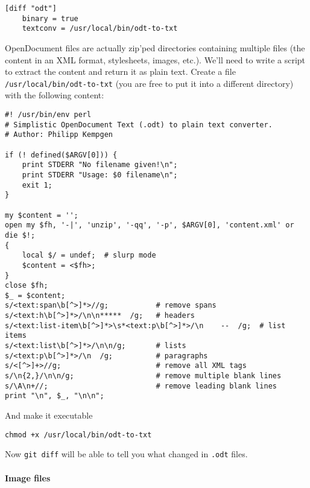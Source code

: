 \documentclass[a4paper]{book}
\newcounter{tab}[chapter]
\begin{document}
\begin{shaded}\begin{verbatim}
[diff "odt"]
	binary = true
	textconv = /usr/local/bin/odt-to-txt
\end{verbatim}\end{shaded}

OpenDocument files are actually zip'ped directories containing multiple files (the content in an XML format, stylesheets, images, etc.). We'll need to write a script to extract the content and return it as plain text. Create a file \texttt{/usr/local/bin/odt-to-txt} (you are free to put it into a different directory) with the following content:

\begin{shaded}\begin{verbatim}
#! /usr/bin/env perl
# Simplistic OpenDocument Text (.odt) to plain text converter.
# Author: Philipp Kempgen

if (! defined($ARGV[0])) {
	print STDERR "No filename given!\n";
	print STDERR "Usage: $0 filename\n";
	exit 1;
}

my $content = '';
open my $fh, '-|', 'unzip', '-qq', '-p', $ARGV[0], 'content.xml' or die $!;
{
	local $/ = undef;  # slurp mode
	$content = <$fh>;
}
close $fh;
$_ = $content;
s/<text:span\b[^>]*>//g;           # remove spans
s/<text:h\b[^>]*>/\n\n*****  /g;   # headers
s/<text:list-item\b[^>]*>\s*<text:p\b[^>]*>/\n    --  /g;  # list items
s/<text:list\b[^>]*>/\n\n/g;       # lists
s/<text:p\b[^>]*>/\n  /g;          # paragraphs
s/<[^>]+>//g;                      # remove all XML tags
s/\n{2,}/\n\n/g;                   # remove multiple blank lines
s/\A\n+//;                         # remove leading blank lines
print "\n", $_, "\n\n";
\end{verbatim}\end{shaded}

And make it executable

\begin{shaded}\begin{verbatim}
chmod +x /usr/local/bin/odt-to-txt
\end{verbatim}\end{shaded}

Now \texttt{git diff} will be able to tell you what changed in \texttt{.odt} files.

\paragraph{Image files}
\end{document}
